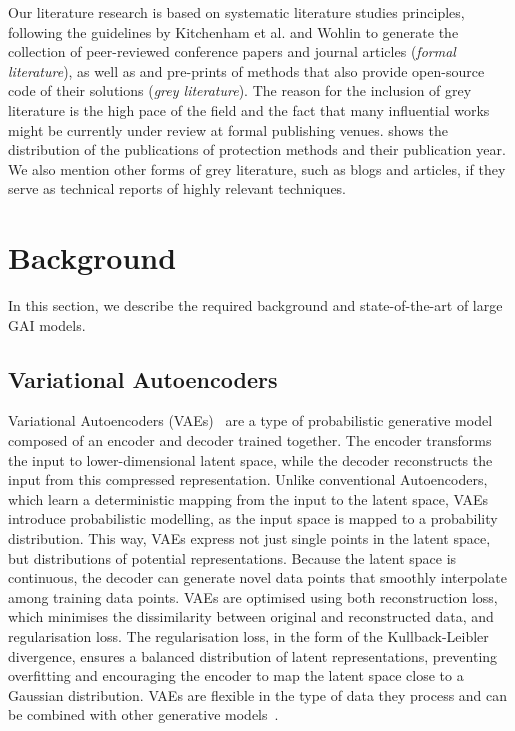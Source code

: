 \documentclass[conference]{IEEEtran}
\begin{document}


Our literature research is based on systematic literature studies principles, following the guidelines by Kitchenham et al. \cite{kitchenham_guidelines_2007} and Wohlin \cite{wohlin_guidelines_2014} to generate the collection of peer-reviewed conference papers and journal articles (\textit{formal literature}), as well as and pre-prints of methods that also provide open-source code of their solutions (\textit{grey literature}). 
The reason for the inclusion of grey literature is the high pace of the field and the fact that many influential works might be currently under review at formal publishing venues.  shows the distribution of the publications of protection methods and their publication year. 
We also mention other forms of grey literature, such as blogs and articles, if they serve as technical reports of highly relevant techniques.  




\section{Background}\label{sec:background}
In this section, we describe the required background and state-of-the-art of large GAI models.

\subsection{Variational Autoencoders}
Variational Autoencoders (VAEs)~\cite{kingma_auto-encoding_2022} are a type of probabilistic generative model composed of an encoder and decoder trained together. The encoder transforms the input to lower-dimensional latent space, while the decoder reconstructs the input from this compressed representation. Unlike conventional Autoencoders, which learn a deterministic mapping from the input to the latent space, VAEs introduce probabilistic modelling, as the input space is mapped to a probability distribution. This way, VAEs express not just single points in the latent space, but distributions of potential representations. Because the latent space is continuous, the decoder can generate novel data points that smoothly interpolate among training data points. 
VAEs are optimised using both reconstruction loss, which minimises the dissimilarity between original and reconstructed data, and regularisation loss. The regularisation loss, in the form of the Kullback-Leibler divergence, ensures a balanced distribution of latent representations, preventing overfitting and encouraging the encoder to map the latent space close to a Gaussian distribution. 
VAEs are flexible in the type of data they process and can be combined with other generative models~\cite{bao_cvae-gan_2017, pandey_diffusevae_2022}.
\end{document}

